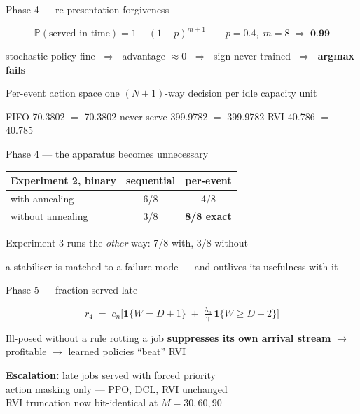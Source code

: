 \documentclass[12pt,aspectratio=169]{beamer}
\newcommand{\good}[1]{\textbf{#1}}
\newcommand{\Prob}{\mathbb{P}}
\begin{document}
\begin{frame}{Phase 4 --- re-presentation forgiveness}

\[
  \Prob(\text{served in time}) = 1-(1-p)^{m+1}
  \qquad p = 0.4,\; m = 8 \;\Rightarrow\; \good{0.99}
\]

\vfill
\centering
stochastic policy fine $\;\Rightarrow\;$ advantage $\approx 0$ $\;\Rightarrow\;$
sign never trained $\;\Rightarrow\;$ \good{argmax fails}

\vfill
\begin{block}{Per-event action space}
\centering
one $(N{+}1)$-way decision per idle capacity unit
\end{block}

\vfill
\centering
\small
FIFO 70.3802 $=$ 70.3802 \quad never-serve 399.9782 $=$ 399.9782 \quad RVI 40.786 $=$ 40.785

\end{frame}

\begin{frame}{Phase 4 --- the apparatus becomes unnecessary}

\begin{center}
\Large
\begin{tabular}{lcc}
\toprule
Experiment 2, binary & sequential & per-event \\
\midrule
with annealing    & 6/8 & 4/8 \\
without annealing & 3/8 & \good{8/8 exact} \\
\bottomrule
\end{tabular}
\end{center}

\vfill
\centering
Experiment 3 runs the \emph{other} way: 7/8 with, 3/8 without

\vfill
\centering
\small a stabiliser is matched to a failure mode --- and outlives its usefulness with it

\end{frame}

\begin{frame}{Phase 5 --- fraction served late}

\[
  r_4 \;=\; c_n\Big[\mathbf{1}\{W = D+1\} \;+\; \tfrac{\lambda_n}{\gamma}\,\mathbf{1}\{W \ge D+2\}\Big]
\]

\vfill
\begin{alertblock}{Ill-posed without a rule}
rotting a job \good{suppresses its own arrival stream} $\to$ profitable $\to$
learned policies ``beat'' RVI
\end{alertblock}

\vfill
\centering
\good{Escalation:} late jobs served with forced priority \\[4pt]
\small
action masking only --- PPO, DCL, RVI unchanged \\
RVI truncation now bit-identical at $M = 30, 60, 90$

\end{frame}
\end{document}
